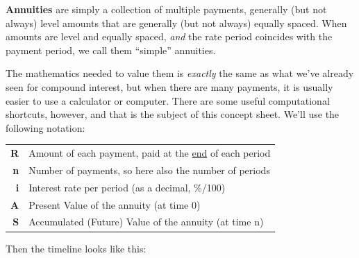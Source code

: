 \documentclass[14pt,twoside]{extarticle}
\begin{document}

\textbf{Annuities} are simply a collection of multiple payments, generally (but not always)
level amounts that are generally (but not always) equally spaced.  When amounts are level and equally
spaced, \emph{and} the rate period coincides with the payment period, we call them ``simple'' annuities.

The mathematics needed to value them is \emph{exactly} the same as what we've already seen for compound
interest, but when there are many payments, it is usually easier to use a calculator or computer.  There
are some useful computational shortcuts, however, and that is the subject of this concept sheet.  We'll
use the following notation:

\begin{center}
  \renewcommand{\arraystretch}{1.2}
  \begin{tabular}{rl}
    \textbf{R} & Amount of each payment, paid at the \underline{end} of each period \\
    \textbf{n} & Number of payments, so here also the number of periods             \\
    \textbf{i} & Interest rate per period (as a decimal, \%/100)                    \\
    \textbf{A} & Present Value of the annuity (at time 0)                           \\
    \textbf{S} & Accumulated (Future) Value of the annuity (at time n)              \\
  \end{tabular}
\end{center}

Then the timeline looks like this:

\begin{center}
\end{center}
\end{document}
